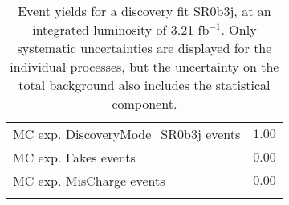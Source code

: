\begin{table}
\begin{center}
{\begin{tabular*}{\textwidth}{@{\extracolsep{\fill}}lr}
        MC exp. DiscoveryMode\_SR0b3j events         & $1.00$              \\
        MC exp. Fakes events         & $0.00$              \\
        MC exp. MisCharge events         & $0.00$              \\
\noalign{\smallskip}\hline\noalign{\smallskip}
\end{tabular*}
}
\end{center}
\caption{Event yields for a discovery fit SR0b3j, at an integrated luminosity of 3.21 fb$^{-1}$. Only systematic uncertainties are displayed for the individual processes, but the uncertainty on the total background also includes the statistical component.}
\label{tab:histfitter:yields:disc:SR0b3j}
\end{table}
%

